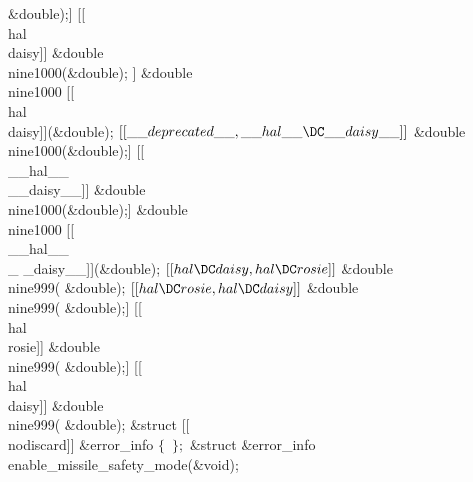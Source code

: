 \&{double});\6
[[\\{deprecated}]] [[\\{hal}\DC\\{daisy}]] \&{double} \\{nine1000}(\&{double});%
\6
[[\\{deprecated}]] \&{double} \\{nine1000} [[\\{hal}\DC\\{daisy}]](\&{double});%
\6
${}[[\\{\_\_deprecated\_\_},\\{\_\_hal\_\_}\DC\\{\_\_daisy\_\_}]]{}$ \&{double}
\\{nine1000}(\&{double});\6
[[\\{\_\_deprecated\_\_}]] [[\\{\_\_hal\_\_}\DC\\{\_\_daisy\_\_}]] \&{double} %
\\{nine1000}(\&{double});\6
[[\\{\_\_deprecated\_\_}]] \&{double} \\{nine1000} [[\\{\_\_hal\_\_}\DC\\{\_%
\_daisy\_\_}]](\&{double});\6
${}[[\\{hal}\DC\\{daisy},\\{hal}\DC\\{rosie}]]{}$ \&{double} \\{nine999}(%
\&{double});\6
${}[[\\{hal}\DC\\{rosie},\\{hal}\DC\\{daisy}]]{}$ \&{double} \\{nine999}(%
\&{double});\6
[[\\{hal}\DC\\{daisy}]] [[\\{hal}\DC\\{rosie}]] \&{double} \\{nine999}(%
\&{double});\6
[[\\{hal}\DC\\{rosie}]] [[\\{hal}\DC\\{daisy}]] \&{double} \\{nine999}(%
\&{double});\6
\&{struct} [[\\{nodiscard}]] \&{error\_info} ${}\{{}$\C{\dots}\6
\,${}\};{}$\6
\&{struct} \&{error\_info} \\{enable\_missile\_safety\_mode}(\&{void});\6
